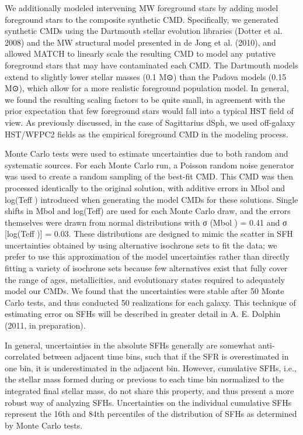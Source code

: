 We additionally modeled intervening MW foreground stars by adding model foreground stars to the composite synthetic CMD. Specifically, we generated synthetic CMDs using the Dartmouth stellar evolution libraries (Dotter et al. 2008) and the MW structural model presented in de Jong et al. (2010), and allowed MATCH to linearly scale the resulting CMD to model any putative foreground stars that may have contaminated each CMD. The Dartmouth models extend to slightly lower stellar masses (0.1 M⊙) than the Padova models (0.15 M⊙), which allow for a more realistic foreground population model. In general, we found the resulting scaling factors to be quite small, in agreement with the prior expectation that few foreground stars would fall into a typical HST field of view. As previously discussed, in the case of Sagittarius dSph, we used off-galaxy HST/WFPC2 fields as the empirical foreground CMD in the modeling process.

Monte Carlo tests were used to estimate uncertainties due to both random and systematic sources. For each Monte Carlo run, a Poisson random noise generator was used to create a random sampling of the best-fit CMD. This CMD was then processed identically to the original solution, with additive errors in Mbol and log(Teff ) introduced when generating the model CMDs for these solutions. Single shifts in Mbol and log(Teff) are used for each Monte Carlo draw, and the errors themselves were drawn from normal distributions with σ (Mbol ) = 0.41 and σ [log(Teff )] = 0.03. These distributions are designed to mimic the scatter in SFH uncertainties obtained by using alternative isochrone sets to fit the data; we prefer to use this approximation of the model uncertainties rather than directly fitting a variety of isochrone sets because few alternatives exist that fully cover the range of ages, metallicities, and evolutionary states required to adequately model our CMDs. We found that the uncertainties were stable after 50 Monte Carlo tests, and thus conducted 50 realizations for each galaxy. This technique of estimating error on SFHs will be described in greater detail in A. E. Dolphin (2011, in preparation).

In general, uncertainties in the absolute SFHs generally are somewhat anti-correlated between adjacent time bins, such that if the SFR is overestimated in one bin, it is underestimated in the adjacent bin. However, cumulative SFHs, i.e., the stellar mass formed during or previous to each time bin normalized to the integrated final stellar mass, do not share this property, and thus present a more robust way of analyzing SFHs. Uncertainties on the individual cumulative SFHs represent the 16th and 84th percentiles of the distribution of SFHs as determined by Monte Carlo tests.
